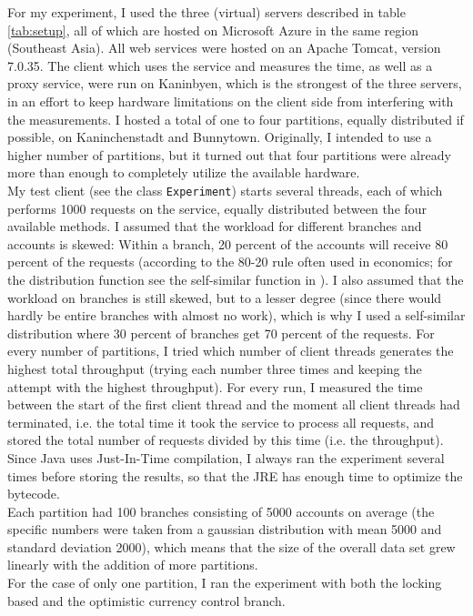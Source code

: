 \documentclass[12pt,a4paper,fleqn]{article}
\begin{document}
For my experiment, I used the three (virtual) servers described in table \ref{tab:setup}, all of which are hosted on Microsoft Azure in the same region (Southeast Asia). All web services were hosted on an Apache Tomcat, version 7.0.35. The client which uses the service and measures the time, as well as a proxy service, were run on Kaninbyen, which is the strongest of the three servers, in an effort to keep hardware limitations on the client side from interfering with the measurements. I hosted a total of one to four partitions, equally distributed if possible, on Kaninchenstadt and Bunnytown. Originally, I intended to use a higher number of partitions, but it turned out that four partitions were already more than enough to completely utilize the available hardware. \\My test client (see the class \texttt{Experiment}) starts several threads, each of which performs 1000 requests on the service, equally distributed between the four available methods. I assumed that the workload for different branches and accounts is skewed: Within a branch, 20 percent of the accounts will receive 80 percent of the requests (according to the 80-20 rule often used in economics; for the distribution function see the self-similar function in \cite{Gray1994}). I also assumed that the workload on branches is still skewed, but to a lesser degree (since there would hardly be entire branches with almost no work), which is why I used a self-similar distribution where 30 percent of branches get 70 percent of the requests. For every number of partitions, I tried which number of client threads generates the highest total throughput (trying each number three times and keeping the attempt with the highest throughput). For every run, I measured the time between the start of the first client thread and the moment all client threads had terminated, i.e. the total time it took the service to process all requests, and stored the total number of requests divided by this time (i.e. the throughput). Since Java uses Just-In-Time compilation, I always ran the experiment several times before storing the results, so that the JRE has enough time to optimize the bytecode. \\
Each partition had 100 branches consisting of 5000 accounts on average (the specific numbers were taken from a gaussian distribution with mean 5000 and standard deviation 2000), which means that the size of the overall data set grew linearly with the addition of more partitions.
\\For the case of only one partition, I ran the experiment with both the locking based and the optimistic currency control branch.
\end{document}
